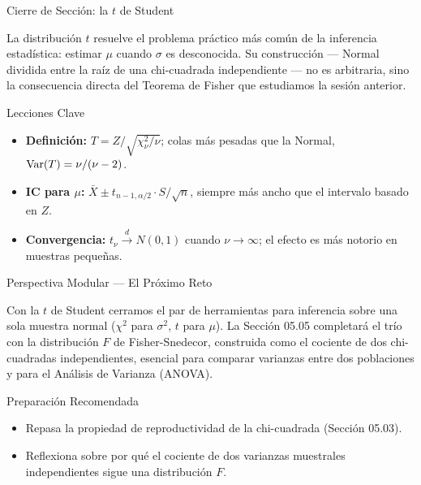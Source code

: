\documentclass[10pt, aspectratio=169]{beamer}
\begin{document}
\begin{frame}{Cierre de Sección: la $t$ de Student}
  \begin{reflexion}
    La distribución $t$ resuelve el problema práctico más común de la inferencia estadística: estimar $\mu$ cuando $\sigma$ es desconocida. Su construcción --- Normal dividida entre la raíz de una chi-cuadrada independiente --- no es arbitraria, sino la consecuencia directa del Teorema de Fisher que estudiamos la sesión anterior.
  \end{reflexion}

  \vspace{0.2cm}
  \pause
  \begin{block}{Lecciones Clave}
    \begin{itemize}\itemsep=0.08cm
      \item \textbf{Definición:} $T=Z/\sqrt{\chi^2_\nu/\nu}$; colas más pesadas que la Normal, $\operatorname{Var}(T)=\nu/(\nu-2)$.
      \item \textbf{IC para $\mu$:} $\bar X \pm t_{n-1,\alpha/2}\cdot S/\sqrt n$, siempre más ancho que el intervalo basado en $Z$.
      \item \textbf{Convergencia:} $t_\nu \xrightarrow{d} N(0,1)$ cuando $\nu\to\infty$; el efecto es más notorio en muestras pequeñas.
    \end{itemize}
  \end{block}
\end{frame}

\begin{frame}{Perspectiva Modular --- El Próximo Reto}
  \scriptsize
  \begin{retoclase}
    Con la $t$ de Student cerramos el par de herramientas para inferencia sobre una sola muestra normal ($\chi^2$ para $\sigma^2$, $t$ para $\mu$). La Sección 05.05 completará el trío con la distribución $F$ de Fisher-Snedecor, construida como el cociente de dos chi-cuadradas independientes, esencial para comparar varianzas entre dos poblaciones y para el Análisis de Varianza (ANOVA).
  \end{retoclase}

  \vspace{0.08cm}
  \pause
  \begin{alertblock}{Preparación Recomendada}
    \begin{itemize}\itemsep=0.06cm
      \item Repasa la propiedad de reproductividad de la chi-cuadrada (Sección 05.03).
      \item Reflexiona sobre por qué el cociente de dos varianzas muestrales independientes sigue una distribución $F$.
    \end{itemize}
  \end{alertblock}
\end{frame}
\end{document}
